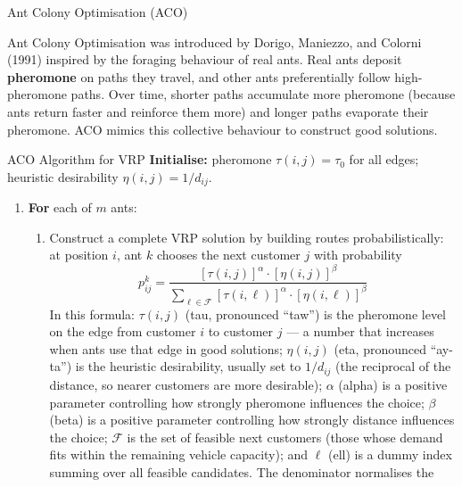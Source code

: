 \documentclass[aspectratio=169,10pt]{beamer}
\begin{document}
\begin{frame}[allowframebreaks]{Ant Colony Optimisation (ACO)}

  Ant Colony Optimisation was introduced by Dorigo, Maniezzo, and Colorni
  (1991) inspired by the foraging behaviour of real ants.  Real ants
  deposit \textbf{pheromone} on paths they travel, and other ants
  preferentially follow high-pheromone paths.  Over time, shorter paths
  accumulate more pheromone (because ants return faster and reinforce
  them more) and longer paths evaporate their pheromone.  ACO mimics
  this collective behaviour to construct good solutions.

  \begin{block}{ACO Algorithm for VRP}
    \textbf{Initialise:} pheromone $\tau(i,j) = \tau_0$ for all edges;
    heuristic desirability $\eta(i,j) = 1/d_{ij}$.
    \begin{enumerate}
      \item \textbf{For} each of $m$ ants:
        \begin{enumerate}
          \item[(a)] Construct a complete VRP solution by building
                routes probabilistically: at position $i$, ant $k$
                chooses the next customer $j$ with probability
                \[
                  p_{ij}^k = \frac{[\tau(i,j)]^{\alpha} \cdot [\eta(i,j)]^{\beta}}
                    {\displaystyle\sum_{\ell \in \mathcal{F}}
                     [\tau(i,\ell)]^{\alpha} \cdot [\eta(i,\ell)]^{\beta}}
                \]
                In this formula: $\tau(i,j)$ (tau, pronounced ``taw'') is
                the pheromone level on the edge from customer $i$ to
                customer $j$ --- a number that increases when ants use that
                edge in good solutions; $\eta(i,j)$ (eta, pronounced
                ``ay-ta'') is the heuristic desirability, usually set to
                $1/d_{ij}$ (the reciprocal of the distance, so nearer
                customers are more desirable); $\alpha$ (alpha) is a
                positive parameter controlling how strongly pheromone
                influences the choice; $\beta$ (beta) is a positive
                parameter controlling how strongly distance influences the
                choice; $\mathcal{F}$ is the set of feasible next customers
                (those whose demand fits within the remaining vehicle
                capacity); and $\ell$ (ell) is a dummy index summing over
                all feasible candidates.  The denominator normalises the

\end{enumerate}
\end{enumerate}
\end{block}
\end{frame}
\end{document}
